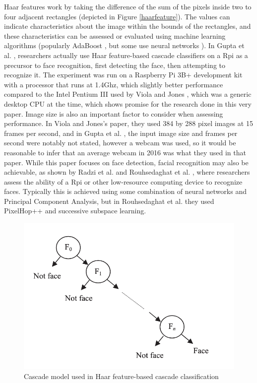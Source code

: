 \documentclass[conference]{IEEEtran}
\begin{document}
Haar features work by taking the difference of the sum of the pixels inside two to four adjacent rectangles (depicted in Figure \ref{haarfeature}). The values can indicate characteristics about the image within the bounds of the rectangles, and these characteristics can be assessed or evaluated using machine learning algorithms (popularly AdaBoost \cite{FiveCuimei,NineHirzi}, but some use neural networks \cite{OneRadzi,EightRazzaq}).
	In Gupta et al. \cite{ThreeGupta}, researchers actually use Haar feature-based cascade classifiers on a Rpi as a precursor to face recognition, first detecting the face, then attempting to recognize it. The experiment was run on a Raspberry Pi 3B+ development kit with a processor that runs at 1.4Ghz, which slightly better performance compared to the Intel Pentium III used by Viola and Jones \cite{SixViola}, which was a generic desktop CPU at the time, which shows promise for the research done in this very paper. 
	Image size is also an important factor to consider when assessing performance. In Viola and Jones’s paper, they used 384 by 288 pixel images at 15 frames per second, and in Gupta et al. \cite{ThreeGupta}, the input image size and frames per second were notably not stated, however a webcam was used,  so it would be reasonable to infer that an average webcam in 2016 was what they used in that paper. 
	While this paper focuses on face detection, facial recognition may also be achievable, as shown by Radzi et al. \cite{OneRadzi} and Rouhsedaghat et al. \cite{FourRouhsedaghat}, where researchers assess the ability of a Rpi or other low-resource computing device to recognize faces. Typically this is achieved using some combination of neural networks and Principal Component Analysis, but in Rouhsedaghat et al. \cite{FourRouhsedaghat} they used PixelHop++ and successive subspace learning.

\begin{figure}[htbp]
\centerline{\includegraphics[scale=0.70]{haarcascade.png}}
\caption{Cascade model used in Haar feature-based cascade classification \cite{FiveCuimei}}
\label{cascademodel}
\end{figure}
\vspace{-10pt}
\end{document}

